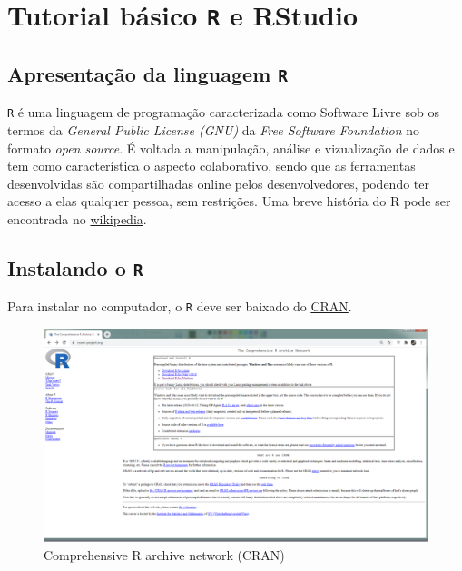\documentclass[
]{book}
\begin{document}
\hypertarget{tuto}{%
\chapter{\texorpdfstring{Tutorial básico \texttt{R} e RStudio}{Tutorial básico R e RStudio}}\label{tuto}}

\hypertarget{apresentauxe7uxe3o-da-linguagem-r}{%
\section{\texorpdfstring{Apresentação da linguagem \texttt{R}}{Apresentação da linguagem R}}\label{apresentauxe7uxe3o-da-linguagem-r}}

\texttt{R} é uma linguagem de programação caracterizada como Software Livre sob os termos da \emph{General Public License (GNU)} da \emph{Free Software Foundation} no formato \emph{open source}. É voltada a manipulação, análise e vizualização de dados e tem como característica o aspecto colaborativo, sendo que as ferramentas desenvolvidas são compartilhadas online pelos desenvolvedores, podendo ter acesso a elas qualquer pessoa, sem restrições. Uma breve história do R pode ser encontrada no \href{https://pt.wikipedia.org/wiki/R_(linguagem_de_programa\%C3\%A7\%C3\%A3o)}{wikipedia}.

\hypertarget{instalando-o-r}{%
\section{\texorpdfstring{Instalando o \texttt{R}}{Instalando o R}}\label{instalando-o-r}}

Para instalar no computador, o \texttt{R} deve ser baixado do \href{https://cran.r-project.org/}{CRAN}.

\begin{figure}
\includegraphics[width=0.9\linewidth]{Figuras/CRAN} \caption{Comprehensive R archive network (CRAN)}\label{fig:cran}
\end{figure}
\end{document}
